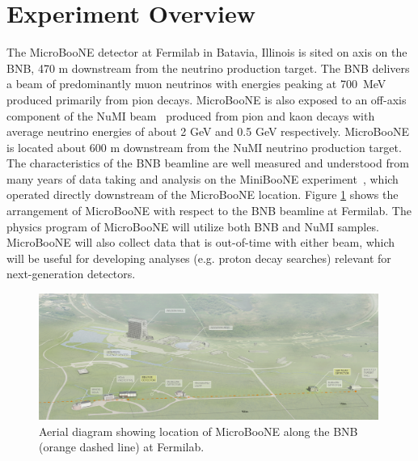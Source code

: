 \section{Experiment Overview}
\label{sec:overview}

The MicroBooNE detector at Fermilab in Batavia, Illinois is sited on axis on the BNB, 470 m downstream from the neutrino production target.   The BNB delivers a beam of predominantly muon neutrinos with energies peaking at 700~MeV produced primarily from pion decays\cite{AguilarArevalo:2008yp}. MicroBooNE is also exposed to an off-axis component of the NuMI beam~\cite{Adamson:2015dkw} produced from pion and kaon decays with average neutrino energies of about 2 GeV and 0.5 GeV respectively.   MicroBooNE is located about 600 m downstream from the NuMI neutrino production target.  The characteristics of the BNB beamline are well measured and understood from many years of data taking and analysis on the MiniBooNE experiment~\cite{AguilarArevalo:2008-MBflux}, which operated directly downstream of the MicroBooNE location.  Figure \ref{fnalmap} shows the arrangement of MicroBooNE with respect to the BNB beamline at Fermilab.  The physics program of MicroBooNE will utilize both BNB and NuMI samples.  MicroBooNE will also collect data that is out-of-time with either beam, which will be useful for developing analyses (e.g. proton decay searches) relevant for next-generation detectors.  


\begin{figure}
\centering 
\includegraphics[width=0.99\textwidth]{figures/aerial_diagram.jpg}
\caption{Aerial diagram showing location of MicroBooNE along the BNB (orange dashed line) at Fermilab.}
\label{fnalmap}
\end{figure}


